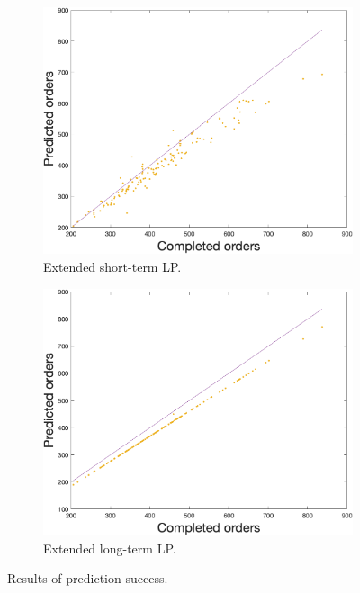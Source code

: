\begin{figure}[h!]
\begin{subfigure}[b]{0.4\textwidth}
            \label{fig:eltlpres}
        \end{subfigure}
        \begin{subfigure}[b]{0.4\textwidth}
            \includegraphics[width=\textwidth]{figures/expCompELP.png}
            \caption{Extended short-term LP.}
            \label{fig:eslpmse}
        \end{subfigure}
        \hspace{0.1\textwidth}
        \begin{subfigure}[b]{0.4\textwidth}
            \includegraphics[width=\textwidth]{figures/expCompELTLP.png}
            \caption{Extended long-term LP.}
            \label{fig:eltlpmse}
        \end{subfigure}
        \caption{Results of prediction success.}
        \label{fig:mseresults}
    \end{figure}
